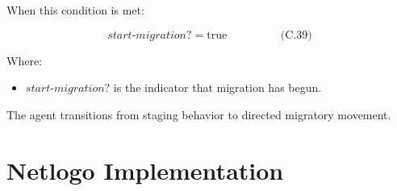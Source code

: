\documentclass[
]{book}
\providecommand{\tightlist}{%
  \setlength{\itemsep}{0pt}\setlength{\parskip}{0pt}}
\begin{document}
When this condition is met:

\[
\begin{equation} start\text{-}migration? = \text{true}  \hspace{2cm} \text{(C.39)} \end{equation}
\]

Where:

\begin{itemize}
\tightlist
\item
  \(start\text{-}migration?\) is the indicator that migration has begun.
\end{itemize}

The agent transitions from staging behavior to directed migratory
movement.

\section{Netlogo Implementation}\label{netlogo-implementation-3}
\end{document}
